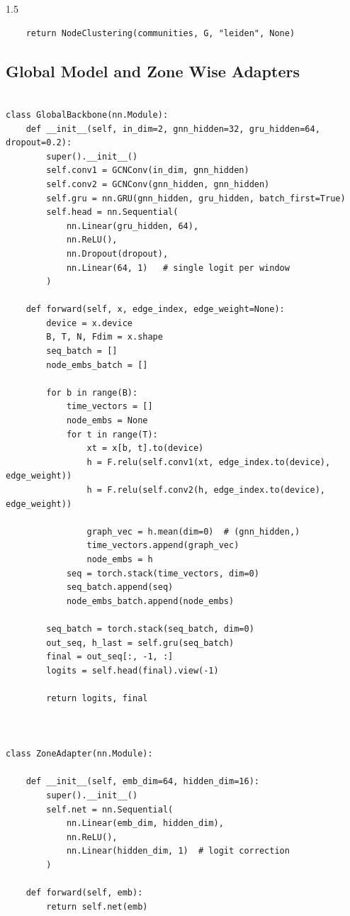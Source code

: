 \begin{spacing}{1.5}
\begin{verbatim}
    return NodeClustering(communities, G, "leiden", None)
\end{verbatim}
\subsection*{Global Model and Zone Wise Adapters}
\begin{verbatim}

class GlobalBackbone(nn.Module):
    def __init__(self, in_dim=2, gnn_hidden=32, gru_hidden=64, dropout=0.2):
        super().__init__()
        self.conv1 = GCNConv(in_dim, gnn_hidden)
        self.conv2 = GCNConv(gnn_hidden, gnn_hidden)
        self.gru = nn.GRU(gnn_hidden, gru_hidden, batch_first=True)
        self.head = nn.Sequential(
            nn.Linear(gru_hidden, 64),
            nn.ReLU(),
            nn.Dropout(dropout),
            nn.Linear(64, 1)   # single logit per window
        )

    def forward(self, x, edge_index, edge_weight=None):
        device = x.device
        B, T, N, Fdim = x.shape
        seq_batch = []
        node_embs_batch = []

        for b in range(B):
            time_vectors = []
            node_embs = None
            for t in range(T):
                xt = x[b, t].to(device)
                h = F.relu(self.conv1(xt, edge_index.to(device), edge_weight))
                h = F.relu(self.conv2(h, edge_index.to(device), edge_weight))
               
                graph_vec = h.mean(dim=0)  # (gnn_hidden,)
                time_vectors.append(graph_vec)
                node_embs = h 
            seq = torch.stack(time_vectors, dim=0) 
            seq_batch.append(seq)
            node_embs_batch.append(node_embs)

        seq_batch = torch.stack(seq_batch, dim=0)
        out_seq, h_last = self.gru(seq_batch)
        final = out_seq[:, -1, :]     
        logits = self.head(final).view(-1) 

        return logits, final



class ZoneAdapter(nn.Module):
   
    def __init__(self, emb_dim=64, hidden_dim=16):
        super().__init__()
        self.net = nn.Sequential(
            nn.Linear(emb_dim, hidden_dim),
            nn.ReLU(),
            nn.Linear(hidden_dim, 1)  # logit correction
        )

    def forward(self, emb):
        return self.net(emb)


\end{verbatim}
\end{spacing}
